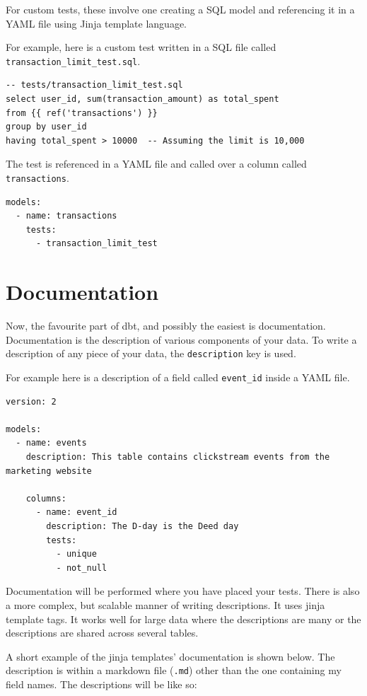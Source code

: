 \documentclass[
]{book}
\begin{document}
For custom tests, these involve one creating a SQL model and referencing it in a YAML file using Jinja template language.

For example, here is a custom test written in a SQL file called \texttt{transaction\_limit\_test.sql}.

\begin{verbatim}
-- tests/transaction_limit_test.sql
select user_id, sum(transaction_amount) as total_spent
from {{ ref('transactions') }}
group by user_id
having total_spent > 10000  -- Assuming the limit is 10,000

\end{verbatim}

The test is referenced in a YAML file and called over a column called \texttt{transactions}.

\begin{verbatim}
models:
  - name: transactions
    tests:
      - transaction_limit_test
\end{verbatim}

\hypertarget{documentation}{%
\section{Documentation}\label{documentation}}

Now, the favourite part of dbt, and possibly the easiest is documentation. Documentation is the description of various components of your data. To write a description of any piece of your data, the \texttt{description} key is used.

For example here is a description of a field called \texttt{event\_id} inside a YAML file.

\begin{verbatim}
version: 2

models:
  - name: events
    description: This table contains clickstream events from the marketing website

    columns:
      - name: event_id
        description: The D-day is the Deed day
        tests:
          - unique
          - not_null
\end{verbatim}

Documentation will be performed where you have placed your tests. There is also a more complex, but scalable manner of writing descriptions. It uses jinja template tags. It works well for large data where the descriptions are many or the descriptions are shared across several tables.

A short example of the jinja templates' documentation is shown below. The description is within a markdown file (\texttt{.md}) other than the one containing my field names. The descriptions will be like so:
\end{document}
